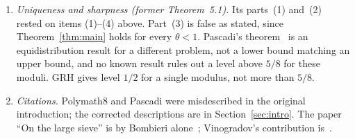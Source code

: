 \documentclass[12pt]{amsart}
\theoremstyle{plain}
\theoremstyle{definition}
\newcommand{\Q}{\mathbb{Q}}
\newcommand{\Qomega}{\Q(\omega)}
\begin{document}
\begin{enumerate}[label=(\arabic*),ref=(\arabic*)]
    not have ``matching'' conductor
    (Proposition~\ref{prop:basechange}(iii)), and neither the
    class-number-one theorem of Baker~\cite{Baker1966} and
    Stark~\cite{Stark1967} nor Stark's effective Brauer--Siegel
    results~\cite{Stark1974} gives a zero-free region for $L$-functions of
    $\Qomega$ of growing conductor.
  \item \emph{Uniqueness and sharpness (former Theorem~5.1).} Its parts~(1)
    and~(2) rested on items (1)--(4) above. Part~(3) is false as stated,
    since Theorem~\ref{thm:main} holds for every $\theta < 1$. Pascadi's
    theorem~\cite{Pascadi2025} is an equidistribution result for a different
    problem, not a lower bound matching an upper bound, and no known result
    rules out a level above $5/8$ for these moduli. GRH gives level $1/2$ for
    a single modulus, not more than $5/8$.
  \item \emph{Citations.} Polymath8 and Pascadi were misdescribed in the
    original introduction; the corrected descriptions are in
    Section~\ref{sec:intro}. The paper ``On the large sieve'' is by Bombieri
    alone~\cite{Bombieri1965}; Vinogradov's contribution
    is~\cite{Vinogradov1965}.
\end{enumerate}
\end{document}
